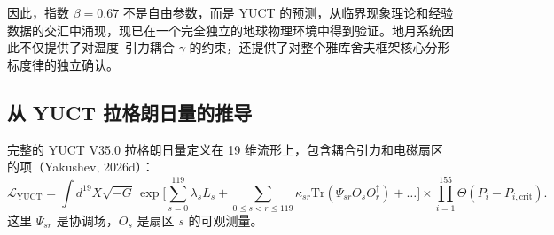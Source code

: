 \documentclass[12pt]{article}
\theoremstyle{remark}
\newcommand{\lagr}{\mathcal{L}}
\begin{document}
	因此，指数 $\beta = 0.67$ 不是自由参数，而是 YUCT 的预测，从临界现象理论和经验数据的交汇中涌现，现已在一个完全独立的地球物理环境中得到验证。地月系统因此不仅提供了对温度–引力耦合 $\gamma$ 的约束，还提供了对整个雅库舍夫框架核心分形标度律的独立确认。
	
	\subsection{从 YUCT 拉格朗日量的推导}
	\label{subsec:lagrangian-derivation}
	
	完整的 YUCT V35.0 拉格朗日量定义在 19 维流形上，包含耦合引力和电磁扇区的项（Yakushev, 2026d）：
	\begin{equation}
		\lagr_{\text{YUCT}} = \int d^{19}X \sqrt{-G} \, 
		\exp\Bigg[ \sum_{s=0}^{119} \lambda_s L_s + \sum_{0\le s<r\le119} \kappa_{sr} \mathrm{Tr}(\Psi_{sr} O_s O_r^\dagger) + \dots \Bigg]
		\times \prod_{i=1}^{155} \Theta(P_i - P_{i,\text{crit}}).
		\label{eq:lagrangian-full}
	\end{equation}
	这里 $\Psi_{sr}$ 是协调场，$O_s$ 是扇区 $s$ 的可观测量。
	
\end{document}
